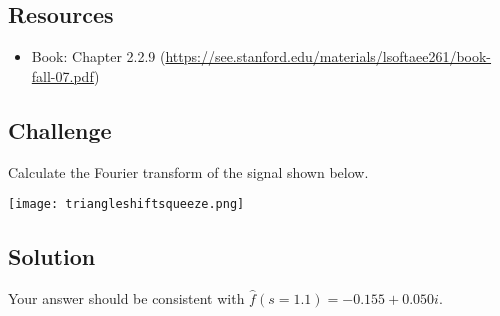 \subsection*{Resources}
\begin{itemize}
    \item Book: Chapter 2.2.9 (\url{https://see.stanford.edu/materials/lsoftaee261/book-fall-07.pdf})
\end{itemize}

\subsection*{Challenge}
Calculate the Fourier transform of the signal shown below.

\texttt{[image: triangleshiftsqueeze.png]}

\subsection*{Solution}
Your answer should be consistent with $\hat{f}(s=1.1) = -0.155 + 0.050 i$.







